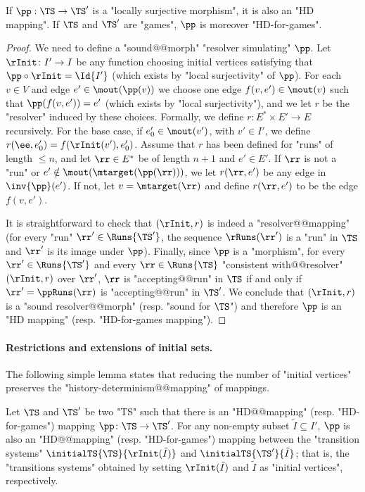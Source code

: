\documentclass[10pt,a4paper]{amsart}
\begin{document}
\begin{lemma}\label{lemma-morph:loc_surjective_implies_HD}
	If $\pp: \TS \to \TS'$ is a "locally surjective morphism", it is also an "HD mapping". If $\TS$ and $\TS'$ are "games", $\pp$ is moreover "HD-for-games". 
\end{lemma}
\begin{proof}
	We need to define a "sound@@morph" "resolver simulating" $\pp$. Let $\rInit\colon I' \to I$ be any function choosing initial vertices satisfying that $\pp\circ\rInit = \Id{I'}$ (which exists by "local surjectivity" of $\pp$). For each $v\in V$ and edge $e'\in \mout(\pp(v))$ we choose one edge $f(v,e')\in \mout(v)$ such that $\pp(f(v,e')) = e'$ (which exists by "local surjectivity"), and we let $r$ be the "resolver" induced by these choices. Formally, we define $r \colon E^*\times E' \to E$ recursively. For the base case, if $e_0'\in \mout(v')$, with $v'\in I'$, we define $r(\ee, e_0') = f(\rInit(v'), e_0')$. Assume that $r$ has been defined for "runs" of length $\leq n$, and let $\rr\in E^*$ be of length $n+1$ and $e'\in E'$. If $\rr$ is not a "run" or $e'\notin \mout(\mtarget(\pp(\rr)))$, we let $r(\rr,e')$ be any edge in $\inv{\pp}(e')$. If not, let $v = \mtarget(\rr)$ and define $r(\rr,e')$ to be the edge $f(v,e')$.
	
	It is straightforward to check that $(\rInit, r)$ is indeed a "resolver@@mapping"  (for every "run" $\rr'\in \Runs{\TS'}$, the sequence $\rRuns(\rr')$ is a "run" in $\TS$ and $\rr'$ is its image under $\pp$). Finally, since $\pp$ is a "morphism", for every $\rr'\in \Runs{\TS'}$ and every $\rr\in \Runs{\TS}$ "consistent with@@resolver" $(\rInit, r)$ over $\rr'$, $\rr$ is "accepting@@run" in $\TS$ if and only if $\rr' = \ppRuns(\rr)$ is  "accepting@@run" in $\TS'$. We conclude that $(\rInit ,r)$ is a "sound resolver@@morph" (resp. "sound for $\TS$") and therefore $\pp$ is an "HD mapping" (resp. "HD-for-games mapping").
\end{proof}





\paragraph*{Restrictions and extensions of initial sets.}


The following simple lemma states that reducing the number of "initial vertices" preserves the "history-determinism@@mapping" of mappings. 
\begin{lemma}\label{lemma-morph:HD mappings-reducing-initial-vertices}
	Let $\TS$ and $\TS'$ be two "TS" such that there is an "HD@@mapping" (resp. "HD-for-games") mapping $\pp\colon \TS \to \TS'$. %
	For any non-empty subset $\tilde{I} \subseteq I'$, $\pp$ is also an "HD@@mapping" (resp. "HD-for-games") mapping between the "transition systems" $\initialTS{\TS}{\rInit(\tilde{I})}$ and $\initialTS{\TS'}{\tilde{I}}$; that is, the "transitions systems" obtained by setting $\rInit(\tilde{I})$ and $\tilde{I}$ as "initial vertices", respectively.
\end{lemma}
\end{document}
